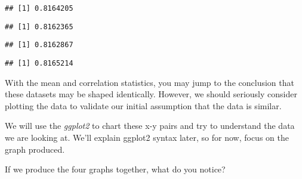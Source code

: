 \documentclass[
]{book}
\newenvironment{Shaded}{\begin{snugshade}}{\end{snugshade}}
\newcommand{\KeywordTok}[1]{\textcolor[rgb]{0.13,0.29,0.53}{\textbf{#1}}}
\newcommand{\NormalTok}[1]{#1}
\newcommand{\OperatorTok}[1]{\textcolor[rgb]{0.81,0.36,0.00}{\textbf{#1}}}
\begin{document}
\begin{Shaded}
\end{Shaded}

\begin{verbatim}
## [1] 0.8164205
\end{verbatim}

\begin{verbatim}
## [1] 0.8162365
\end{verbatim}

\begin{verbatim}
## [1] 0.8162867
\end{verbatim}

\begin{verbatim}
## [1] 0.8165214
\end{verbatim}

With the mean and correlation statistics, you may jump to the conclusion that these datasets may be shaped identically. However, we should seriously consider plotting the data to validate our initial assumption that the data is similar.

We will use the \emph{ggplot2} to chart these x-y pairs and try to understand the data we are looking at. We'll explain ggplot2 syntax later, so for now, focus on the graph produced.

If we produce the four graphs together, what do you notice?
\end{document}
